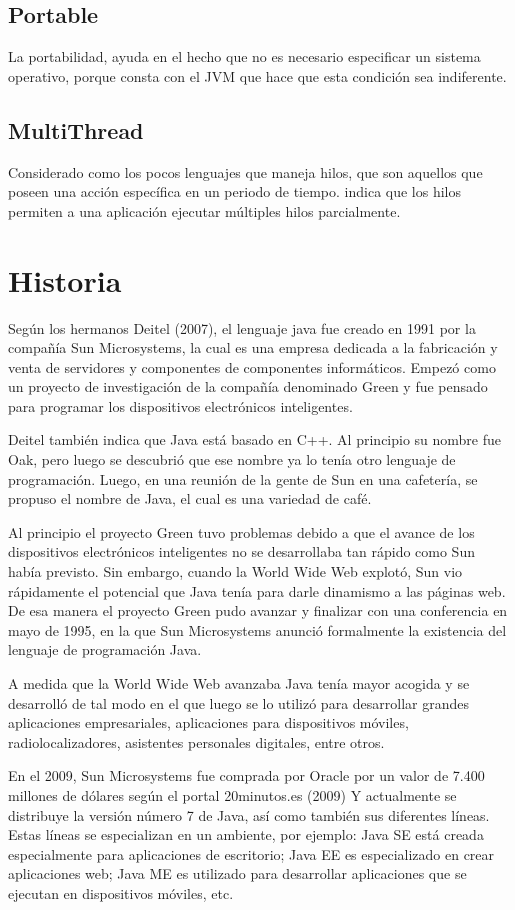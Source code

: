 \documentclass[12pt]{book} %
\begin{document}
\section{Portable}
La portabilidad, ayuda en el hecho que no es necesario especificar un sistema operativo, porque consta con el JVM que hace que esta condición sea indiferente.
\section{MultiThread}
Considerado como los pocos lenguajes que maneja hilos, que son aquellos que poseen una acción específica en un periodo de tiempo. \cite{thread} indica que los hilos permiten a una aplicación ejecutar múltiples hilos parcialmente.

\chapter{Historia}
Según los hermanos Deitel (2007), el lenguaje java fue creado en 1991 por la compañía Sun Microsystems, la cual es una empresa dedicada a la fabricación y venta de servidores y componentes de componentes informáticos. Empezó como un proyecto de investigación de la compañía denominado Green y fue pensado para programar los dispositivos electrónicos inteligentes.

Deitel también indica que Java está basado en C++. Al principio su nombre fue Oak, pero luego se descubrió que ese nombre ya lo tenía otro lenguaje de programación. Luego, en una reunión de la gente de Sun en una cafetería, se propuso el nombre de Java, el cual es una variedad de café.

Al principio el proyecto Green tuvo problemas debido a que el avance de los dispositivos electrónicos inteligentes no se desarrollaba tan rápido como Sun había previsto. Sin embargo, cuando la World Wide Web explotó, Sun vio rápidamente el potencial que Java tenía para darle dinamismo a las páginas web. De esa manera el proyecto Green pudo avanzar y finalizar con una conferencia en mayo de 1995, en la que Sun Microsystems anunció formalmente la existencia del lenguaje de programación Java. 

A medida que la World Wide Web avanzaba Java tenía mayor acogida y se desarrolló de tal modo en el que luego se lo utilizó para desarrollar grandes aplicaciones empresariales, aplicaciones para dispositivos móviles, radiolocalizadores, asistentes personales digitales, entre otros. 

En el 2009, Sun Microsystems fue comprada por Oracle por un valor de 7.400 millones de dólares según el portal 20minutos.es (2009) Y actualmente se distribuye la versión número 7 de Java, así como también sus diferentes líneas. Estas líneas se especializan en un ambiente, por ejemplo: Java SE está creada especialmente para aplicaciones de escritorio; Java EE es especializado en crear aplicaciones web; Java ME es utilizado para desarrollar aplicaciones que se ejecutan en dispositivos móviles, etc.
\end{document}
